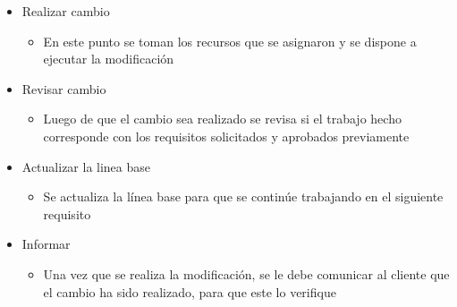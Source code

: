 \begin{itemize}
\begin{itemize}
    \end{itemize}
    \item Realizar cambio
    \begin{itemize}
        \item En este punto se toman los recursos que se asignaron y se dispone a ejecutar la modificación
    \end{itemize}
    \item Revisar cambio
    \begin{itemize}
        \item Luego de que el cambio sea realizado se revisa si el trabajo hecho corresponde con los requisitos solicitados y aprobados previamente
    \end{itemize}
    \item Actualizar la linea base
    \begin{itemize}
        \item Se actualiza la línea base para que se continúe trabajando en el siguiente requisito
    \end{itemize}
    \item Informar
    \begin{itemize}
        \item Una vez que se realiza la modificación, se le debe comunicar al cliente que el cambio ha sido realizado, para que este lo verifique
    \end{itemize}
\end{itemize}


